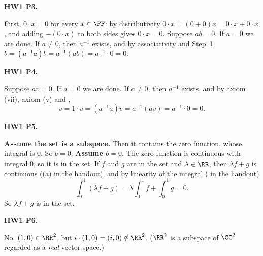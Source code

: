 \documentclass[10pt]{scrartcl}
\begin{document}
\begin{prob}\textbf{HW1 P3.}\par{}
\begin{steps}
  \ii First, $0\cdot x=0$ for every $x\in\FF$: by distributivity $0\cdot x=(0+0)x=0\cdot x+0\cdot x$, and adding $-(0\cdot x)$ to both sides gives $0\cdot x=0$.
  \ii Suppose $ab=0$. If $a=0$ we are done. If $a\ne0$, then $a^{-1}$ exists, and by associativity and Step~1, $b=(a^{-1}a)b=a^{-1}(ab)=a^{-1}\cdot0=0$.
\end{steps}
\end{prob}

\begin{prob}\textbf{HW1 P4.}\par{}
Suppose $av=0$. If $a=0$ we are done. If $a\ne0$, then $a^{-1}$ exists, and by axiom (vii), axiom (v) and ,
\[
  v=1\cdot v=(a^{-1}a)v=a^{-1}(av)=a^{-1}\cdot0=0.
\]
\end{prob}

\begin{prob}\textbf{HW1 P5.}\par{}
\begin{steps}
  \ii \textbf{Assume the set is a subspace.} Then it contains the zero function, whose integral is $0$. So $b=0$.
  \ii \textbf{Assume $b=0$.} The zero function is continuous with integral $0$, so it is in the set. If $f$ and $g$ are in the set and $\lambda\in\RR$, then $\lambda f+g$ is continuous ((a) in the handout), and by linearity of the integral ( in the handout)
  \[
    \int_0^1(\lambda f+g)=\lambda\int_0^1 f+\int_0^1 g=0.
  \]
  So $\lambda f+g$ is in the set.
\end{steps}
\end{prob}

\begin{prob}\textbf{HW1 P6.}\par{}
No. $(1,0)\in\RR^2$, but $i\cdot(1,0)=(i,0)\notin\RR^2$. ($\RR^2$ is a subspace of $\CC^2$ regarded as a \emph{real} vector space.)
\end{prob}
\end{document}
